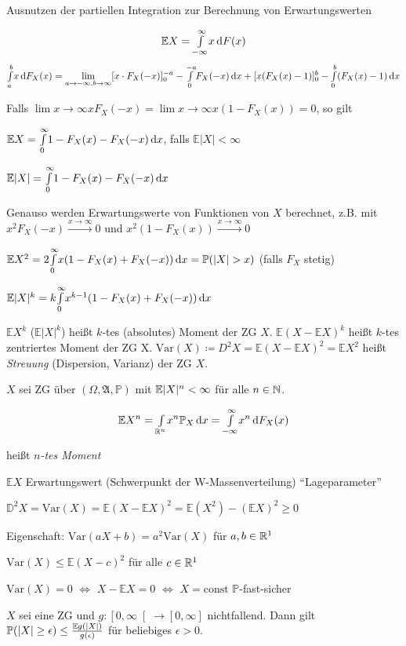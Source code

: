 \documentclass{cheat-sheet}
\newcommand{\Alg}{\mathfrak{A}} %
\renewcommand{\P}{\mathbb{P}} %
\newcommand{\E}{\mathbb{E}} %
\newcommand{\Var}{\mathrm{Var}} %
\begin{document}
Ausnutzen der partiellen Integration zur Berechnung von Erwartungswerten

\[ \E X = \Int{- \infty}{\infty}{x}{F(x)} \]
\[ {\textstyle \int\limits_{a}^{b}} x \,\mathrm{d} F_X(x) = \lim_{a \to -\infty, b \to \infty} [x \cdot F_X(-x)]_0^{-a} - {\textstyle \int\limits_{0}^{-a}} F_X(-x) \,\mathrm{d} x + [x (F_X(x) - 1)]_0^b - {\textstyle \int\limits_{0}^{b}} (F_X(x) - 1) \,\mathrm{d} x \]

Falls $\lim{x \to \infty} x F_X(-x) = \lim{x \to \infty} x (1 - F_X(x)) = 0$, so gilt

$\E X = \Int{0}{\infty}{1 - F_X(x) - F_X(-x)}{x}$, falls $\E |X| < \infty$

$\E |X| = \Int{0}{\infty}{1 - F_X(x) - F_X(-x)}{x}$

Genauso werden Erwartungswerte von Funktionen von $X$ berechnet, z.B. mit $x^2 F_X(-x) \xrightarrow{x \to \infty} 0$ und $x^2 (1 - F_X(x)) \xrightarrow{x \to \infty} 0$

$\E X^2 = 2 \Int{0}{\infty}{x (1 - F_X(x) + F_X(-x))}{x} = \P(|X| > x)$ (falls $F_X$ stetig)

$\E |X|^k = k \Int{0}{\infty}{x^{k-1} (1 - F_X(x) + F_X(-x))}{x}$

\begin{defn}
  $\E X^k$ ($\E |X|^k$) heißt $k$-tes (absolutes) Moment der ZG $X$. $\E (X - \E X)^k$ heißt $k$-tes zentriertes Moment der ZG X. $\mathrm{Var}(X) \coloneqq D^2 X = \E (X - \E X)^2 = \E X^2$ heißt \emph{Streuung} (Dispersion, Varianz) der ZG $X$.
\end{defn}





$X$ sei ZG über $(\Omega, \Alg, \P)$ mit $\E \abs{X}^n < \infty$ für alle $n \in \mathbb{N}$.

\[ \E X^n = \Int{\R^n}{}{x^n \P_X}{x} = \Int{-\infty}{\infty}{x^n}{F_X(x)} \]

heißt \emph{$n$-tes Moment}

$\E X$ Erwartungswert (Schwerpunkt der W-Massenverteilung) "`Lageparameter"'

$\mathbb{D}^2 X = \Var(X) = \E(X-\E X)^2 = \E(X^2) - (\E X)^2 \geq 0$

Eigenschaft: $\Var(aX+b) = a^2 \Var(X)$ für $a, b \in \mathbb{R}^1$

$\Var(X) \leq \E (X-c)^2$ für alle $c \in \mathbb{R}^1$

$\Var(X) = 0$ $\iff$ $X - \E X = 0$ $\iff$ $X = \mathrm{const}$ $\P$-fast-sicher

\begin{satz}
  $X$ sei eine ZG und $g : \left[ 0, \infty \right[ \to [0,\infty]$ nichtfallend. Dann gilt $\P(\abs{X} \geq \epsilon) \leq \frac{\E g(\abs{X})}{g(\epsilon)}$ für beliebiges $\epsilon > 0$.
\end{satz}
\end{document}
